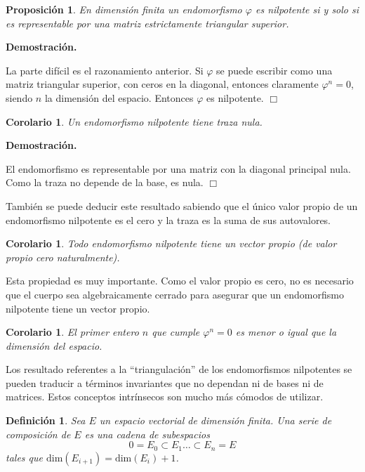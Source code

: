 \documentclass[a4paper,draft,12pt]{scrartcl}
\newtheorem{defi}{Definición}[section]%
\newtheorem{propo}[teo]{Proposición}%
\newtheorem{cor}[teo]{Corolario}%
\newcommand{\dem}{\noindent \textbf{Demostración. }\vspace{0.3 cm}}%
\newcommand{\fin}{ $\Box $ \vspace{0.4 cm}}
\newcommand{\df}[1]{\textsf{\color{blue}#1}}
\begin{document}
\begin{propo}

En dimensión finita un endomorfismo $\varphi$ es nilpotente si y solo si es representable por una matriz estrictamente triangular superior.

\end{propo}

\dem

La parte difícil es el razonamiento anterior. Si $\varphi$ se puede escribir como una matriz triangular superior, con ceros en la diagonal, entonces claramente $\varphi^n=0$, siendo $n$ la dimensión del espacio.  Entonces $\varphi$ es nilpotente.  \fin

\begin{cor}

Un endomorfismo nilpotente tiene traza nula.

\end{cor}

\dem

El endomorfismo es representable por una matriz con la diagonal principal nula.  Como la traza no depende de la base,  es nula.    \fin

También se puede deducir este resultado sabiendo que el único valor propio de un endomorfismo nilpotente es el cero y la traza es la suma de sus autovalores.

\begin{cor}

Todo endomorfismo nilpotente tiene un vector propio (de valor propio cero naturalmente).

\end{cor}

Esta propiedad es muy importante.  Como el valor propio es cero, no es necesario que el cuerpo sea algebraicamente cerrado para asegurar que un endomorfismo nilpotente tiene un vector propio.

\begin{cor}

El primer entero $n$ que cumple $\varphi^n=0$ es menor o igual que la dimensión del espacio.

\end{cor}

Los resultado referentes a la ``triangulación'' de los endomorfismos nilpotentes se pueden traducir a términos invariantes que  no dependan ni de bases ni de matrices.  Estos conceptos intrínsecos son mucho más cómodos de utilizar.

\begin{defi}

Sea $E$ un espacio vectorial de dimensión finita. Una  \df{serie de composición}  de $E$ es una cadena de subespacios
$$
0=E_0\subset E_1 \dots \subset E_n=E
$$
tales que $\text{dim}(E_{i+1})= \text{dim}(E_i)+1$.

\end{defi}
\end{document}
